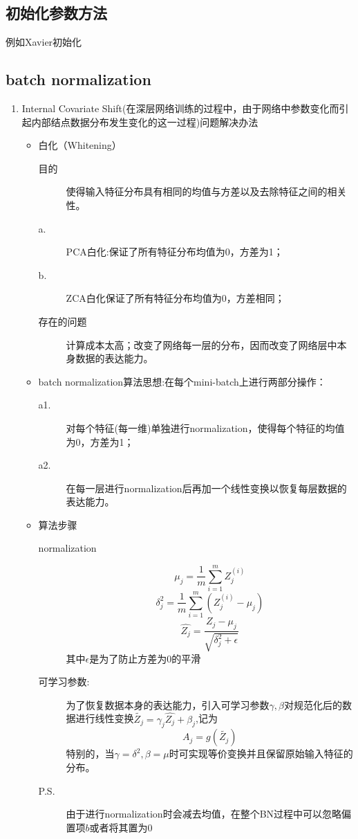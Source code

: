 \documentclass[UTF8]{article}%
\begin{document}
		\subsection{初始化参数方法}
		例如Xavier初始化
		\subsection{batch normalization}
			\begin{enumerate}
				\item  Internal Covariate Shift(在深层网络训练的过程中，由于网络中参数变化而引起内部结点数据分布发生变化的这一过程)问题解决办法
				\begin{itemize}
					\item 白化（Whitening）
						\begin{description}
							\item[目的]使得输入特征分布具有相同的均值与方差以及去除特征之间的相关性。
							\item[a.] PCA白化:保证了所有特征分布均值为0，方差为1；
							\item[b.] ZCA白化保证了所有特征分布均值为0，方差相同；
							\item[存在的问题] 计算成本太高；改变了网络每一层的分布，因而改变了网络层中本身数据的表达能力。
						\end{description}
					\item batch normalization算法思想:在每个mini-batch上进行两部分操作：
						\begin{description}
							\item[a1.] 对每个特征(每一维)单独进行normalization，使得每个特征的均值为0，方差为1；
							\item[a2.] 在每一层进行normalization后再加一个线性变换以恢复每层数据的表达能力。
						\end{description}
					\item 算法步骤
						\begin{description}
							\item[normalization] $$\mu_j=\frac{1}{m}\sum_{i=1}^{m}Z_j^{(i)}$$ $$\delta_j^2=\frac{1}{m}\sum_{i=1}^{m}(Z_j^{(i)}-\mu_j)$$ $$\hat{Z_j}=\frac{Z_j-\mu_j}{\sqrt{\delta_j^2+\epsilon}}$$
							其中$\epsilon$是为了防止方差为0的平滑
							\item [可学习参数: ] 为了恢复数据本身的表达能力，引入可学习参数$\gamma,\beta$对规范化后的数据进行线性变换$\tilde{ Z_j}=\gamma_j\hat{Z_j}+\beta_j$,记为$$A_j=g(\tilde{ Z_j})$$特别的，当$\gamma=\delta^2,\beta=\mu$时可实现等价变换并且保留原始输入特征的分布。
							\item[P.S.]由于进行normalization时会减去均值，在整个BN过程中可以忽略偏置项$b$或者将其置为0

\end{description}
\end{itemize}
\end{enumerate}
\end{document}

